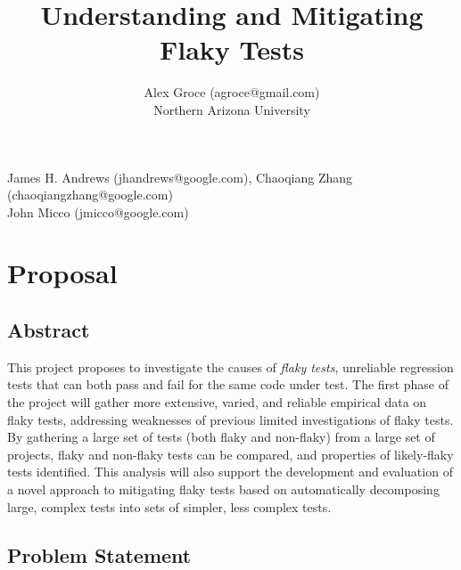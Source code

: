 \documentclass[10pt]{article}
\title{Understanding and Mitigating Flaky Tests}
\author{Alex Groce (agroce@gmail.com)\\Northern Arizona University}
\date{}
\begin{document}
\maketitle


{\scriptsize
{} James H. Andrews (jhandrews@google.com), Chaoqiang Zhang (chaoqiangzhang@google.com) \\
 John Micco (jmicco@google.com)
}
\section{Proposal}

\subsection{Abstract}

This project proposes to investigate the causes of \emph{flaky tests}, unreliable regression tests that can both pass and fail for the same code under test.  The first phase of the project will gather more extensive, varied, and reliable empirical data on flaky tests, addressing weaknesses of previous limited investigations of flaky tests.  By gathering a large set of tests (both flaky and non-flaky) from a large set of projects, flaky and non-flaky tests can be compared, and properties of likely-flaky tests identified.  This analysis will also support the development and evaluation of a novel approach to mitigating flaky tests based on automatically decomposing large, complex tests into sets of simpler, less complex tests.

\subsection{Problem Statement}
\end{document}
